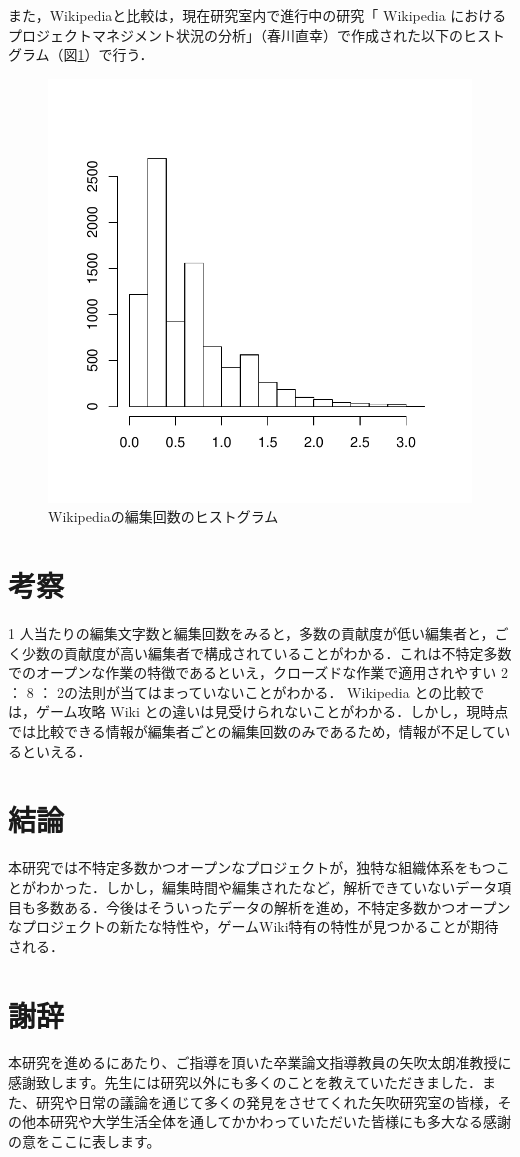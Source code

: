  また，Wikipediaと比較は，現在研究室内で進行中の研究「 Wikipedia におけるプロジェクトマネジメント状況の分析」（春川直幸）で作成された以下のヒストグラム（図\ref{W}）で行う．

\begin{figure}[thbp]
   \includegraphics[width=13cm]{logp.pdf}
   \caption{Wikipediaの編集回数のヒストグラム}
   \label{W}
 \end{figure}

\chapter{考察}

1 人当たりの編集文字数と編集回数をみると，多数の貢献度が低い編集者と，ごく少数の貢献度が高い編集者で構成されていることがわかる．これは不特定多数でのオープンな作業の特徴であるといえ，クローズドな作業で適用されやすい 2 ： 8 ： 2の法則が当てはまっていないことがわかる．
Wikipedia との比較では，ゲーム攻略 Wiki との違いは見受けられないことがわかる．しかし，現時点では比較できる情報が編集者ごとの編集回数のみであるため，情報が不足しているといえる．

\chapter{結論}

本研究では不特定多数かつオープンなプロジェクトが，独特な組織体系をもつことがわかった．しかし，編集時間や編集されたなど，解析できていないデータ項目も多数ある．今後はそういったデータの解析を進め，不特定多数かつオープンなプロジェクトの新たな特性や，ゲームWiki特有の特性が見つかることが期待される．




\chapter*{謝辞}

本研究を進めるにあたり、ご指導を頂いた卒業論文指導教員の矢吹太朗准教授に感謝致します。先生には研究以外にも多くのことを教えていただきました．また、研究や日常の議論を通じて多くの発見をさせてくれた矢吹研究室の皆様，その他本研究や大学生活全体を通してかかわっていただいた皆様にも多大なる感謝の意をここに表します。



